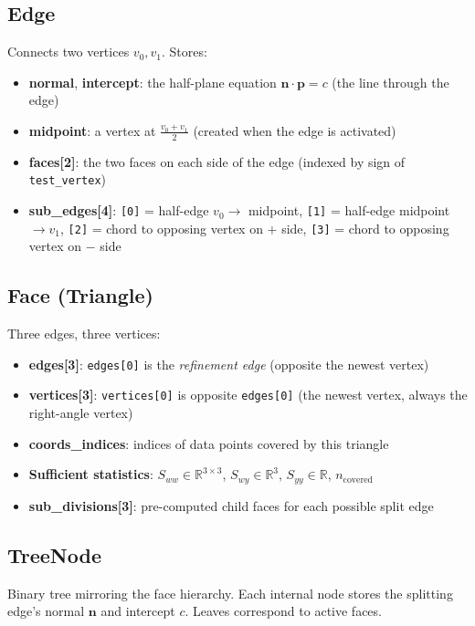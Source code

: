 \documentclass{article}
\begin{document}
\subsection{Edge}
Connects two vertices $v_0, v_1$. Stores:
\begin{itemize}
    \item \textbf{normal}, \textbf{intercept}: the half-plane equation $\mathbf{n} \cdot \mathbf{p} = c$ (the line through the edge)
    \item \textbf{midpoint}: a vertex at $\frac{v_0 + v_1}{2}$ (created when the edge is activated)
    \item \textbf{faces[2]}: the two faces on each side of the edge (indexed by sign of \texttt{test\_vertex})
    \item \textbf{sub\_edges[4]}: \texttt{[0]} = half-edge $v_0 \to$ midpoint, \texttt{[1]} = half-edge midpoint $\to v_1$, \texttt{[2]} = chord to opposing vertex on $+$ side, \texttt{[3]} = chord to opposing vertex on $-$ side
\end{itemize}

\subsection{Face (Triangle)}
Three edges, three vertices:
\begin{itemize}
    \item \textbf{edges[3]}: \texttt{edges[0]} is the \emph{refinement edge} (opposite the newest vertex)
    \item \textbf{vertices[3]}: \texttt{vertices[0]} is opposite \texttt{edges[0]} (the newest vertex, always the right-angle vertex)
    \item \textbf{coords\_indices}: indices of data points covered by this triangle
    \item \textbf{Sufficient statistics}: $S_{ww} \in \mathbb{R}^{3\times3}$, $S_{wy} \in \mathbb{R}^3$, $S_{yy} \in \mathbb{R}$, $n_{\text{covered}}$
    \item \textbf{sub\_divisions[3]}: pre-computed child faces for each possible split edge
\end{itemize}

\subsection{TreeNode}
Binary tree mirroring the face hierarchy. Each internal node stores the splitting edge's normal $\mathbf{n}$ and intercept $c$. Leaves correspond to active faces.
\end{document}
